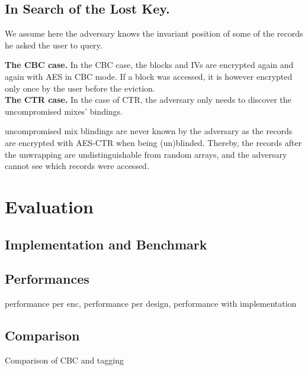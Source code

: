\documentclass[USenglish,oneside,twocolumn]{article}
\begin{document}
\subsection{In Search of the Lost Key.}
We assume here the adversary knows the invariant position of some of the records he asked the user to query. 

\noindent\textbf{The CBC case.}
In the CBC case, the blocks and IVs are encrypted again and again with AES in CBC mode. If a block was accessed, it is however encrypted only once by the user before the eviction.\\

\noindent\textbf{The CTR case.}
In the case of CTR, the adversary only needs to discover the uncompromised mixes' bindings. 

uncompromised mix blindings are never known by the adversary as the records are encrypted with AES-CTR when being (un)blinded. Thereby, the records after the unwrapping are undistinguishable from random arrays, and the adversary cannot see which records were accessed.

\section{Evaluation}\label{Evaluation}
\subsection{Implementation and Benchmark}\label{Implementation}
\subsection{Performances}\label{Performance}
performance per enc, performance per design, performance with implementation
\subsection{Comparison}\label{Comparison}
Comparison of CBC and tagging
\end{document}
